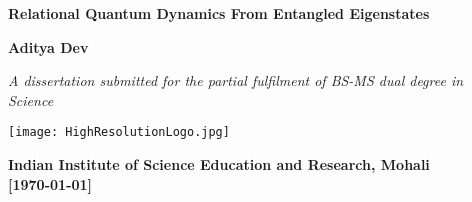 \begin{titlepage}

    \begin{center}
        \sffamily
        \LARGE
        \textbf{Relational Quantum Dynamics From Entangled Eigenstates}
        \vspace{1cm}
        
        \Large
        \textbf{Aditya Dev}
    
        \vspace{1cm}
        \large
        
        \textit{A dissertation submitted for the partial fulfilment of
        BS-MS dual degree in Science}
        
        \vspace{3.5cm}
    
        \texttt{[image: HighResolutionLogo.jpg]}
        \vspace{1cm}
        
        \large
        \textbf{Indian Institute of Science Education and Research, Mohali}\\
        \large
        \textbf{[\today]} 
    
    \end{center}
    
    
    \end{titlepage}
